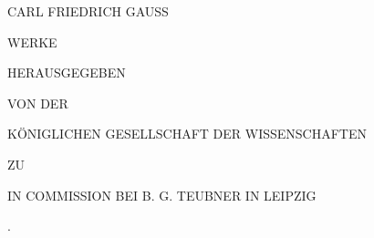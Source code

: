 \thispagestyle{empty}
\begin{center}
\vspace*{1em}
{\Large CARL FRIEDRICH GAUSS\par}
\vspace{2em}
{\LARGE WERKE\par}
\vspace{2em}
{\large{}\par}
\vspace{5em}
HERAUSGEGEBEN\par
\medskip
VON DER\par
\medskip
KÖNIGLICHEN GESELLSCHAFT DER WISSENSCHAFTEN\par
\medskip
ZU\par
\medskip
{}\par
\vfill
IN COMMISSION BEI B. G. TEUBNER IN LEIPZIG\par
{}.
\end{center}
\clearpage
